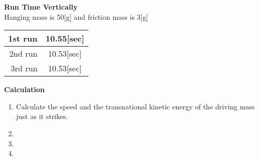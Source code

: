 \documentclass[12pt,letterpaper,fleqn]{article}
\begin{document}
\begin{center}
{\large\bf Run Time Vertically}
\\ Hanging mass is 50[g] and friction mass is 3[g]\\
\end{center}


\begin{table}[htb]
\begin{center}
\begin{tabular}{|r||c|}\hline
	1st run & 10.55[sec]\\\hline
	2nd run & 10.53[sec]\\\hline
	3rd run & 10.53[sec]\\\hline
\end{tabular}
\end{center}
\end{table}



\begin{flushleft}
{\large \bf Calculation}
\end{flushleft}

\begin{enumerate}
\item Calculate the speed and the transnational kinetic energy of the driving mass just as it strikes. 




\item
\item
\item
\end{enumerate}
\end{document}
